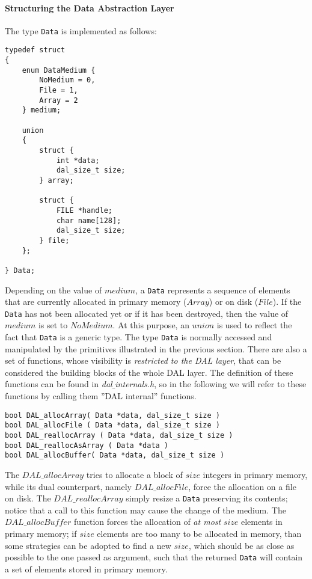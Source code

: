 \paragraph{Structuring the Data Abstraction Layer}
The type \texttt{Data} is implemented as follows:
\begin{lstlisting}
typedef struct
{
	enum DataMedium {
		NoMedium = 0,
		File = 1,
		Array = 2
	} medium;
	
	union 
	{
		struct {
			int *data;
			dal_size_t size;
		} array;
		
		struct {
			FILE *handle;
			char name[128];
			dal_size_t size;
		} file;
	};
	
} Data;
\end{lstlisting}
Depending on the value of $medium$, a \texttt{Data} represents a sequence of elements that are currently allocated in primary memory ($Array$) or on disk ($File$). If the \texttt{Data} has not been allocated yet or if it has been destroyed, then the value of $medium$ is set to $NoMedium$. At this purpose, an $union$ is used to reflect the fact that \texttt{Data} is a generic type. The type \texttt{Data} is normally accessed and manipulated by the primitives illustrated in the previous section. There are also a set of functions, whose visibility is \textit{restricted to the DAL layer}, that can be considered the building blocks of the whole DAL layer. The definition of these functions can be found in \textit{dal$\_$internals.h}, so in the following we will refer to these functions by calling them ''DAL internal'' functions.
\begin{lstlisting}
bool DAL_allocArray( Data *data, dal_size_t size )
bool DAL_allocFile ( Data *data, dal_size_t size )
bool DAL_reallocArray ( Data *data, dal_size_t size )
bool DAL_reallocAsArray ( Data *data )
bool DAL_allocBuffer( Data *data, dal_size_t size )
\end{lstlisting}
The $DAL\_allocArray$ tries to allocate a block of $size$ integers in primary memory, while its dual counterpart, namely $DAL\_allocFile$, force the allocation on a file on disk. The $DAL\_reallocArray$ simply resize a \texttt{Data} preserving its contents; notice that a call to this function may cause the change of the medium. The $DAL\_allocBuffer$ function forces the allocation of \textit{at most} $size$ elements in primary memory; if $size$ elements are too many to be allocated in memory, than some strategies can be adopted to find a new $size$, which should be as close as possible to the one passed as argument, such that the returned \texttt{Data} will contain a set of elements stored in primary memory.
